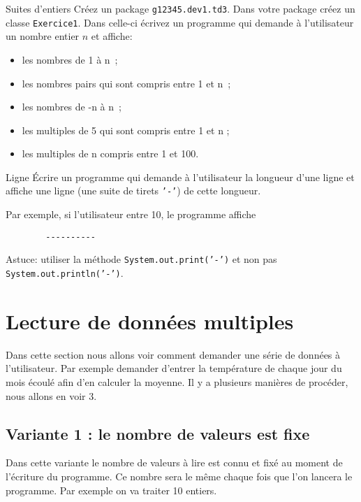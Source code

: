 \documentclass[a4paper,11pt]{article}
\begin{document}
 
	\begin{Exercice}{Suites d'entiers}	
		Créez un package \texttt{g12345.dev1.td3}.
		Dans votre package créez un classe \texttt{Exercice1}.
		Dans celle-ci écrivez un programme qui demande à l'utilisateur un nombre entier $n$ et affiche:
		\begin{itemize}
			\item  les nombres de 1 à n~;
			\item  les nombres pairs qui sont compris entre 1 et n~;
			\item les nombres de -n à n~;
			\item les multiples de 5 qui sont compris entre 1 et n ;
			\item les multiples de n compris entre 1 et 100.
		\end{itemize}
	\end{Exercice}

	\begin{Exercice}{Ligne}	
		\'Ecrire un programme qui demande à l'utilisateur 
		la longueur d'une ligne et affiche une ligne (une suite de tirets \texttt{'-'}) de cette longueur.
		
		Par exemple, si l'utilisateur entre 10, le programme affiche
		
		\begin{verbatim}
		----------
		\end{verbatim}
		
		Astuce: utiliser la méthode \texttt{System.out.print('-')} et non pas \texttt{System.out.println('-')}.
	\end{Exercice}
 
 \section{Lecture de données multiples}
 
 	Dans cette section nous allons voir comment demander une série de données à l'utilisateur.
	Par exemple demander d'entrer la température de chaque jour du mois écoulé afin d'en calculer la moyenne.
	Il y a plusieurs manières de procéder, nous allons en voir 3.

	\subsection{Variante 1 : le nombre de valeurs est fixe}

		Dans cette variante le nombre de valeurs à lire est connu et fixé au moment de l'écriture du 
		programme. Ce nombre sera le même chaque fois que l'on
		lancera le programme.
		Par exemple on va traiter 10 entiers. 	
			
\end{document}
